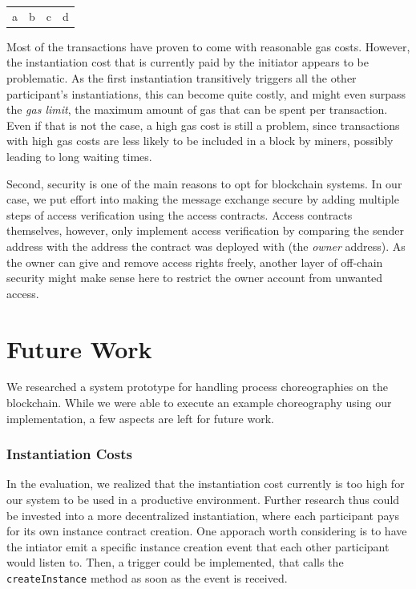 \documentclass[runningheads]{llncs}
\begin{document}
\begin{tabular}{l|l|l|l}
	a & b & c & d
\end{tabular}

Most of the transactions have proven to come with reasonable gas costs.
However, the instantiation cost that is currently paid by the initiator appears to be problematic.
As the first instantiation transitively triggers all the other participant's instantiations, this can become quite costly, and might even surpass the \emph{gas limit}, the maximum amount of gas that can be spent per transaction.
Even if that is not the case, a high gas cost is still a problem, since transactions with high gas costs are less likely to be included in a block by miners, possibly leading to long waiting times. %

Second, security is one of the main reasons to opt for blockchain systems.
In our case, we put effort into making the message exchange secure by adding multiple steps of access verification using the access contracts.
Access contracts themselves, however, only implement access verification by comparing the sender address with the address the contract was deployed with (the \emph{owner} address).
As the owner can give and remove access rights freely, another layer of off-chain security might make sense here to restrict the owner account from unwanted access.


\section{Future Work} \label{futurework}

We researched a system prototype for handling process choreographies on the blockchain.
While we were able to execute an example choreography using our implementation, a few aspects are left for future work.

\subsubsection{Instantiation Costs}

In the evaluation, we realized that the instantiation cost currently is too high for our system to be used in a productive environment.
Further research thus could be invested into a more decentralized instantiation, where each participant pays for its own instance contract creation.
One apporach worth considering is to have the intiator emit a specific instance creation event that each other participant would listen to.
Then, a trigger could be implemented, that calls the \texttt{createInstance} method as soon as the event is received.
\end{document}
